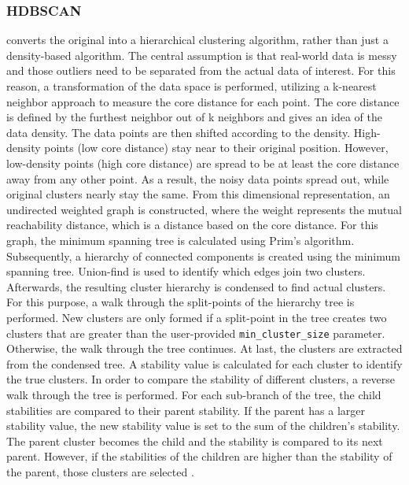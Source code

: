 \documentclass[12pt,a4paper,english]{article}
\begin{document}
	\subsubsection*{HDBSCAN}
    \hdbscan converts the original \dbscan \citep{dbscan:96} into a hierarchical clustering algorithm, rather than just a density-based algorithm.
	The central assumption is that real-world data is messy and those outliers need to be separated from the actual data of interest. For this reason, a transformation of the data space is performed, utilizing a k-nearest neighbor approach to measure the core distance for each point. The core distance is defined by the furthest neighbor out of k neighbors and gives an idea of the data density. The data points are then shifted according to the density. High-density points (low core distance) stay near to their original position. However, low-density points (high core distance) are spread to be at least the core distance away from any other point. As a result, the noisy data points spread out, while original clusters nearly stay the same.
	From this dimensional representation, an undirected weighted graph is constructed, where the weight represents the mutual reachability distance, which is a distance based on the core distance. For this graph, the minimum spanning tree is calculated using Prim's algorithm.
	Subsequently, a hierarchy of connected components is created using the minimum spanning tree. Union-find is used to identify which edges join two clusters.
	Afterwards, the resulting cluster hierarchy is condensed to find actual clusters. For this purpose, a walk through the split-points of the hierarchy tree is performed. New clusters are only formed if a split-point in the tree creates two clusters that are greater than the user-provided \texttt{min\_cluster\_size} parameter. Otherwise, the walk through the tree continues.
	At last, the clusters are extracted from the condensed tree. A stability value is calculated for each cluster to identify the true clusters. In order to compare the stability of different clusters, a reverse walk through the tree is performed. For each sub-branch of the tree, the child stabilities are compared to their parent stability. If the parent has a larger stability value, the new stability value is set to the sum of the children's stability. The parent cluster becomes the child and the stability is compared to its next parent.
	However, if the stabilities of the children are higher than the stability of the parent, those clusters are selected \citep{hdbscan}.
	
\end{document}
